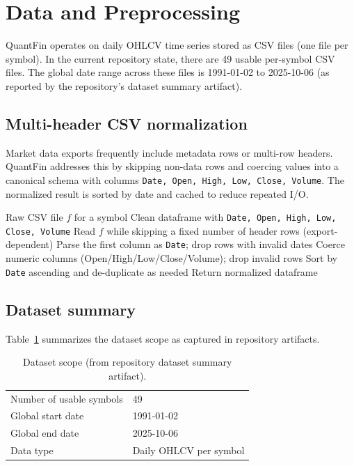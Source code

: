 \documentclass{svproc}
\begin{document}
\section{Data and Preprocessing}\label{sec:data}
QuantFin operates on daily OHLCV time series stored as CSV files (one file per symbol). In the current repository state, there are 49 usable per-symbol CSV files. The global date range across these files is 1991-01-02 to 2025-10-06 (as reported by the repository's dataset summary artifact).

\subsection{Multi-header CSV normalization}\label{sec:multiheader}
Market data exports frequently include metadata rows or multi-row headers. QuantFin addresses this by skipping non-data rows and coercing values into a canonical schema with columns \texttt{Date, Open, High, Low, Close, Volume}. The normalized result is sorted by date and cached to reduce repeated I/O.

\begin{algorithm}[h!]
\caption{Multi-header OHLCV normalization (repo-aligned)}
\label{alg:normalize}
\begin{algorithmic}[1]
\REQUIRE Raw CSV file $f$ for a symbol
\ENSURE Clean dataframe with \texttt{Date, Open, High, Low, Close, Volume}
\STATE Read $f$ while skipping a fixed number of header rows (export-dependent)
\STATE Parse the first column as \texttt{Date}; drop rows with invalid dates
\STATE Coerce numeric columns (Open/High/Low/Close/Volume); drop invalid rows
\STATE Sort by \texttt{Date} ascending and de-duplicate as needed
\STATE Return normalized dataframe
\end{algorithmic}
\end{algorithm}

\subsection{Dataset summary}\label{sec:dataset_summary}
Table~\ref{tab:dataset} summarizes the dataset scope as captured in repository artifacts.

\begin{table}[h!]
\centering
\caption{Dataset scope (from repository dataset summary artifact).}
\label{tab:dataset}
\begin{tabular}{|l|l|}
\hline
Number of usable symbols & 49 \\
Global start date & 1991-01-02 \\
Global end date & 2025-10-06 \\
Data type & Daily OHLCV per symbol \\
\hline
\end{tabular}
\end{table}
\end{document}
